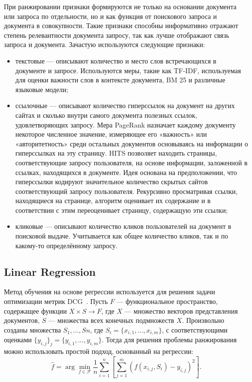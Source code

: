При ранжировании признаки формируются не только на основании документа или запроса по отдельности, но и как функция от поискового запроса и документа в совокупности. Такие признаки способны информативно отражают степень релевантности документа запросу, так как лучше отображают связь запроса и документа.
Зачастую используются следующие признаки:
\begin{itemize}[label=---]
	\item текстовые --- описывают количество и место слов встречающихся в документе и запросе. Используются меры, такие как TF-IDF, используемая для оценки важности слов в контексте документа, BM 25 и различные языковые модели;
	\item ссылочные --- описывают количество гиперссылок на документ на других сайтах и сколько внутри самого документа полезных ссылок, удовлетворяющих запросу. Мера PageRank назначает каждому документу некоторое численное значение, измеряющее его «важность» или «авторитетность» среди остальных документов основываясь на информации о гиперссылках на эту страницу.   HITS позволяет находить страницы, соответствующие запросу пользователя, на основе информации, заложенной в ссылках, находящихся в документе. Идея основана на предположении, что гиперссылки кодируют значительное количество скрытых сайтов соответствующий запросу пользователя. Рекурсивно просматривая ссылки, находящиеся на странице, алгоритм оценивает их содержание и в соответствии с этим переоценивает страницу, содержащую эти ссылки;
	\item кликовые --- описывают количество кликов пользователей на документ в поисковой выдаче. Учитывается как общее количество кликов, так и по какому-то определённому запросу.
\end{itemize}

\subsection{Linear Regression}

 Метод обучения на основе регрессии используется для решения задачи оптимизации метрик DCG~\cite{LR}. Пусть $F$ --- функциональное пространство, содержащее функции $X \times S \to F$, где $X$ --- множество векторов представления документов, $S$ --- множества всех конечных подмножеств $X$. Произвольно созданы множества $S_{1}, \dots, S{n}$, где $S_{i} = \{x_{i,1}, \dots, x_{i,m}\}$, с соответствующими оценками $\{y_{i,j}\}_{j} = \{y_{i,1}, \dots, y_{i,m}\}$. Тогда для решения проблемы ранжирования можно использовать простой подход, основанный на регрессии:
\begin{equation}
	\label{eq:LR1}
	\hat{f}=\arg \min _{f \in \mathcal{F}} \frac{1}{n} \sum_{i=1}^n[\sum_{j=1}^m(f(x_{i, j}, S_i)-y_{i, j})^2].
\end{equation}

